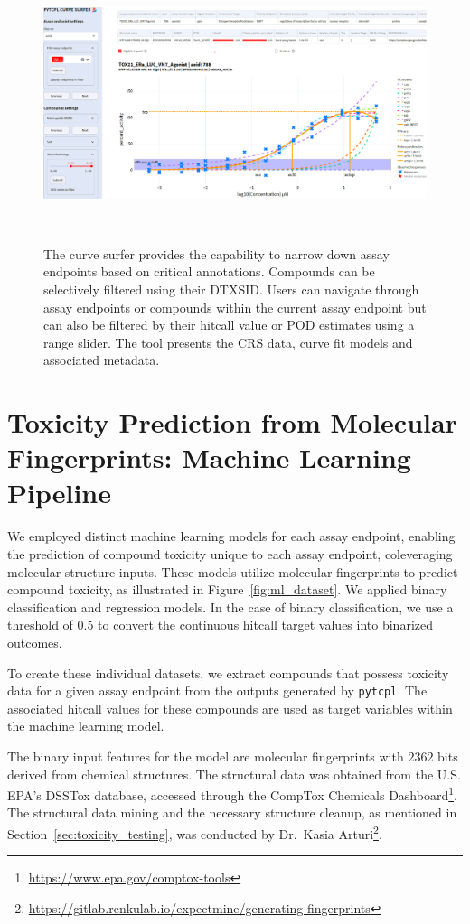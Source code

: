 \begin{figure}[h]
    \centering
    \includegraphics[width=1.0\textwidth]{figures/curve_surfer.png}
    \caption{The curve surfer provides the capability to narrow down assay endpoints based on critical annotations. Compounds can be selectively filtered using their DTXSID. Users can navigate through assay endpoints or compounds within the current assay endpoint but can also be filtered by their hitcall value or POD estimates using a range slider. The tool presents the CRS data, curve fit models and associated metadata.}
~\label{fig:curve_surfer}
\end{figure}

\newpage
\section{Toxicity Prediction from Molecular Fingerprints: Machine Learning Pipeline}
We employed distinct machine learning models for each assay endpoint, enabling the prediction of compound toxicity unique to each assay endpoint, coleveraging molecular structure inputs.
These models utilize molecular fingerprints to predict compound toxicity, as illustrated in Figure~\ref{fig:ml_dataset}. We applied binary classification and regression models. In the case of binary classification, we use a threshold of $0.5$ to convert the continuous hitcall target values into binarized outcomes.

To create these individual datasets, we extract compounds that possess toxicity data for a given assay endpoint from the outputs generated by \texttt{pytcpl}. The associated hitcall values for these compounds are used as target variables within the machine learning model.

The binary input features for the model are molecular fingerprints with $2362$ bits derived from chemical structures. The structural data was obtained from the U.S. EPA's DSSTox database, accessed through the CompTox Chemicals Dashboard\footnote{\url{https://www.epa.gov/comptox-tools}}. The structural data mining and the necessary structure cleanup, as mentioned in Section~\ref{sec:toxicity_testing}, was conducted by Dr.\ Kasia Arturi\footnote{\url{https://gitlab.renkulab.io/expectmine/generating-fingerprints}}.


